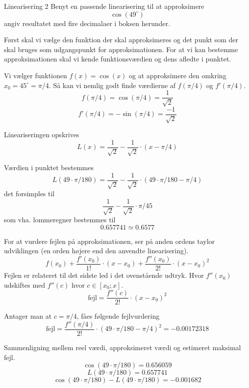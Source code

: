 \documentclass{article}
\begin{document}
\begin{exercise}{Linearisering 2}
Benyt en passende linearisering til at approksimere
\[
\cos(49^\circ)
\]
angiv resultatet med fire decimalaer i boksen herunder.

\hint
Først skal vi vælge den funktion der skal approksimeres
og det punkt som der skal bruges som udgangspunkt for 
approksimationen.
For at vi kan bestemme approksimationen skal vi 
kende funktionsværdien og dens afledte i punktet.

\hint
Vi vælger funktionen $f(x) = \cos(x)$ og at approksimere den 
omkring $x_0 = 45^\circ = \pi / 4$.
Så kan vi nemlig godt finde værdierne af $f(\pi / 4)$ og $f'(\pi / 4)$.
\[
f(\pi / 4) = \cos(\pi / 4) = \frac{1}{\sqrt{2}}
\]
\[
f'(\pi / 4) = -\sin(\pi / 4) = \frac{-1}{\sqrt{2}}
\]

\hint
Lineariseringen opskrives
\[
L(x) = \frac{1}{\sqrt{2}} - \frac{1}{\sqrt{2}} \cdot (x - \pi / 4)
\]

\hint
Værdien i punktet bestemmes
\[
L(49 \cdot \pi / 180) = \frac{1}{\sqrt{2}} - \frac{1}{\sqrt{2}} \cdot (49 \cdot \pi / 180 - \pi / 4) 
\]
det forsimples til 
\[
\frac{1}{\sqrt{2}} - \frac{1}{\sqrt{2}} \cdot \pi / 45
\]
som vha. lommeregner bestemmes til 
\[
0.657741 \simeq 0.6577
\]

\hint
For at vurdere fejlen på approksimationen, ser på anden 
ordens taylor udviklingen (en orden højere end den 
anvendte linearisering).
\[
f(x_0) 
	+ \frac{f'(x_0)}{1!} \cdot (x - x_0) 
	+ \frac{f''(x_0)}{2!} \cdot (x - x_0)^2
\]
Fejlen er relateret til det sidste led i det ovenstående udtryk.
Hvor $f''(x_0)$ udskiftes med $f''(c)$ hvor $c \in [x_0; x]$.
\[
\textrm{fejl} = \frac{f''(c)}{2!} \cdot (x - x_0)^2
\]

\hint 
Antager man at $c = \pi/4$, fåes følgende fejlvurdering
\[
\textrm{fejl} = \frac{f''(\pi/4)}{2!} \cdot (49 \cdot \pi / 180 - \pi / 4)^2 = 
-0.00172318\]

\hint
Sammenligning mellem reel værdi, approksimeret værdi og estimeret maksimal fejl.
\[
\cos(49 \cdot \pi/180) = 0.656059
\]
\[
L(49 \cdot \pi/180) = 0.657741
\]
\[
\cos(49 \cdot \pi/180) - L(49 \cdot \pi/180) = -0.001682
\]

\end{exercise}
\end{document}
